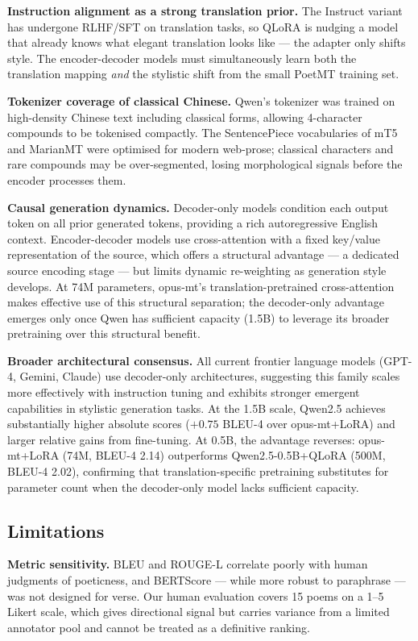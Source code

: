    \textbf{Instruction alignment as a strong translation prior.} The Instruct variant has undergone RLHF/SFT on translation tasks, so QLoRA is nudging a model that already knows what elegant translation looks like --- the adapter only shifts style. The encoder-decoder models must simultaneously learn both the translation mapping \emph{and} the stylistic shift from the small PoetMT training set.

    \textbf{Tokenizer coverage of classical Chinese.} Qwen's tokenizer was trained on high-density Chinese text including classical forms, allowing 4-character compounds to be tokenised compactly. The SentencePiece vocabularies of mT5 and MarianMT were optimised for modern web-prose; classical characters and rare compounds may be over-segmented, losing morphological signals before the encoder processes them.

    \textbf{Causal generation dynamics.} Decoder-only models condition each output token on all prior generated tokens, providing a rich autoregressive English context. Encoder-decoder models use cross-attention with a fixed key/value representation of the source, which offers a structural advantage --- a dedicated source encoding stage --- but limits dynamic re-weighting as generation style develops. At 74M parameters, opus-mt's translation-pretrained cross-attention makes effective use of this structural separation; the decoder-only advantage emerges only once Qwen has sufficient capacity (1.5B) to leverage its broader pretraining over this structural benefit.

    \textbf{Broader architectural consensus.} All current frontier language models (GPT-4, Gemini, Claude) use decoder-only architectures, suggesting this family scales more effectively with instruction tuning and exhibits stronger emergent capabilities in stylistic generation tasks. At the 1.5B scale, Qwen2.5 achieves substantially higher absolute scores ($+0.75$ BLEU-4 over opus-mt+LoRA) and larger relative gains from fine-tuning. At 0.5B, the advantage reverses: opus-mt+LoRA (74M, BLEU-4 2.14) outperforms Qwen2.5-0.5B+QLoRA (500M, BLEU-4 2.02), confirming that translation-specific pretraining substitutes for parameter count when the decoder-only model lacks sufficient capacity.

\subsection{Limitations}

\textbf{Metric sensitivity.} BLEU and ROUGE-L correlate poorly with human judgments of poeticness, and BERTScore --- while more robust to paraphrase --- was not designed for verse. Our human evaluation covers 15 poems on a 1--5 Likert scale, which gives directional signal but carries variance from a limited annotator pool and cannot be treated as a definitive ranking.

